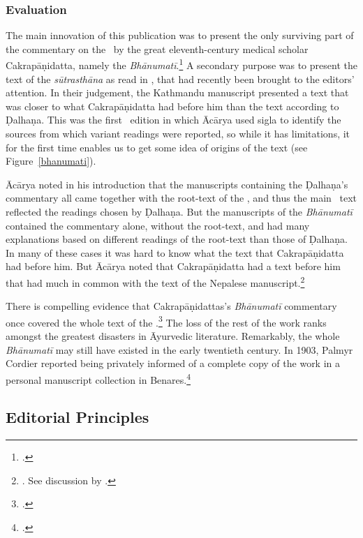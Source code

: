 \subsubsection{Evaluation}

The main innovation of this publication was to present the only surviving part of
the commentary on the \SS\ by the great eleventh-century medical scholar
Cakrapāṇidatta, namely the \emph{Bhānumatī}.\footcite[IA, 374--375 and IB,
495--496]{meul-hist} A secondary purpose was to present the text of the
\emph{sūtrasthāna} as read in , that had recently 
been
brought to the editors' attention. In their judgement, the Kathmandu manuscript
presented a text that was closer to what Cakrapāṇidatta had before him than the
text according to Ḍalhaṇa.   This was the first \SS\ edition in which Ācārya used
sigla to identify the sources from which variant readings were reported, so while
it has limitations, it for the first time enables us to get some idea of origins
of the text (see Figure~\ref{bhanumati}).

Ācārya noted in his introduction that the manuscripts containing the Ḍalhaṇa's
commentary all came together with the root-text of the \SS, and thus the main \SS\
text reflected the readings chosen by Ḍalhaṇa.  But the manuscripts of the
\emph{Bhānumatī} contained the commentary alone, without the root-text, and 
had
many explanations based on different readings of the root-text than those of
Ḍalhaṇa.  In many of these cases it was hard to know what the text that
Cakrapāṇidatta had before him. But Ācārya noted that Cakrapāṇidatta had a text
before him that had much in common with the text of the Nepalese
manuscript.\footnote{\cite[3--4]{acar-1939}.  See discussion by
\citet[7]{kleb-2021a}.}  

There is compelling evidence that Cakrapāṇidattas's \emph{Bhānumatī} 
commentary
once covered the whole text of the \SS.\footcite[IA, 375]{meul-hist}  The loss of
the rest of the work ranks amongst the greatest disasters in Āyurvedic
literature.  Remarkably, the whole \emph{Bhānumatī} may still have existed in the
early twentieth century. In 1903, Palmyr Cordier reported being privately informed
of a complete copy of the work in a personal manuscript collection in
Benares.\footcite[332]{cord-1903}
   
\subsection{Editorial Principles}
